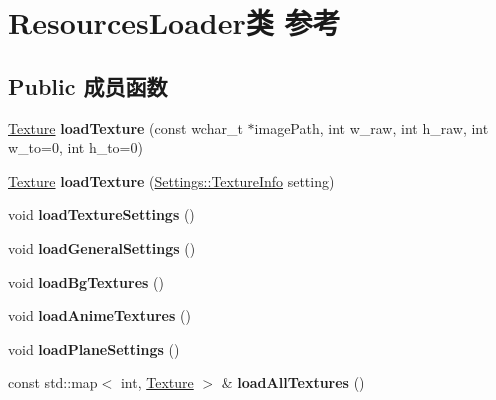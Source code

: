 \hypertarget{class_resources_loader}{}\section{Resources\+Loader类 参考}
\label{class_resources_loader}
\subsection*{Public 成员函数}
\begin{DoxyCompactItemize}
\item 
\mbox{\label{class_resources_loader_a38cbe5a4029c4a6fe999a8405703fc30}} 
\hyperlink{struct_texture}{Texture} {\bfseries load\+Texture} (const wchar\+\_\+t $\ast$image\+Path, int w\+\_\+raw, int h\+\_\+raw, int w\+\_\+to=0, int h\+\_\+to=0)
\item 
\mbox{\label{class_resources_loader_a29b4b9fedb76dc01abcfacc2b31cf25c}} 
\hyperlink{struct_texture}{Texture} {\bfseries load\+Texture} (\hyperlink{struct_settings_1_1_texture_info}{Settings\+::\+Texture\+Info} setting)
\item 
\mbox{\label{class_resources_loader_a80e1d1bb8339e48b0becf401f205436e}} 
void {\bfseries load\+Texture\+Settings} ()
\item 
\mbox{\label{class_resources_loader_aae8a0b49efa4191ba01cc832c32dbd95}} 
void {\bfseries load\+General\+Settings} ()
\item 
\mbox{\label{class_resources_loader_a5099528fcfd109b389965e5ebfbdb661}} 
void {\bfseries load\+Bg\+Textures} ()
\item 
\mbox{\label{class_resources_loader_afd356d180bfc92e6135996b3d290d3ae}} 
void {\bfseries load\+Anime\+Textures} ()
\item 
\mbox{\label{class_resources_loader_a56b70b8ad03c9fde2736d425adfd97e7}} 
void {\bfseries load\+Plane\+Settings} ()
\item 
\mbox{\label{class_resources_loader_afe684ff2f1419210e4bbd608c67ffeb3}} 
const std\+::map$<$ int, \hyperlink{struct_texture}{Texture} $>$ \& {\bfseries load\+All\+Textures} ()
\end{DoxyCompactItemize}
